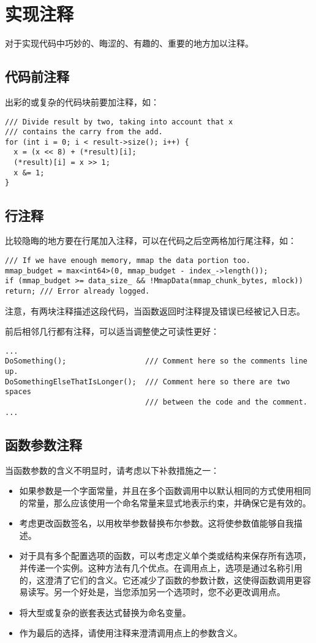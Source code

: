 \section{实现注释}
对于实现代码中巧妙的、晦涩的、有趣的、重要的地方加以注释。


\subsection{代码前注释}
出彩的或复杂的代码块前要加注释，如：
\begin{verbatim}
/// Divide result by two, taking into account that x
/// contains the carry from the add.
for (int i = 0; i < result->size(); i++) {
  x = (x << 8) + (*result)[i];
  (*result)[i] = x >> 1;
  x &= 1;
}
\end{verbatim}


\subsection{行注释}
比较隐晦的地方要在行尾加入注释，可以在代码之后空两格加行尾注释，如：
\begin{verbatim}
/// If we have enough memory, mmap the data portion too.
mmap_budget = max<int64>(0, mmap_budget - index_->length());
if (mmap_budget >= data_size_ && !MmapData(mmap_chunk_bytes, mlock))
return; /// Error already logged.
\end{verbatim}

注意，有两块注释描述这段代码，当函数返回时注释提及错误已经被记入日志。

前后相邻几行都有注释，可以适当调整使之可读性更好：
\begin{verbatim}
...
DoSomething();                  /// Comment here so the comments line up.
DoSomethingElseThatIsLonger();  /// Comment here so there are two spaces
                                /// between the code and the comment.
...
\end{verbatim}


\subsection{函数参数注释}
当函数参数的含义不明显时，请考虑以下补救措施之一：
\begin{itemize}
\item 如果参数是一个字面常量，并且在多个函数调用中以默认相同的方式使用相同的常量，那么应该使用一个命名常量来显式地表示约束，并确保它是有效的。
\item 考虑更改函数签名，以用枚举参数替换布尔参数。这将使参数值能够自我描述。
\item 对于具有多个配置选项的函数，可以考虑定义单个类或结构来保存所有选项，并传递一个实例。这种方法有几个优点。在调用点上，选项是通过名称引用的，这澄清了它们的含义。它还减少了函数的参数计数，这使得函数调用更容易读写。另一个好处是，当您添加另一个选项时，您不必更改调用点。
\item 将大型或复杂的嵌套表达式替换为命名变量。
\item 作为最后的选择，请使用注释来澄清调用点上的参数含义。
\end{itemize}

